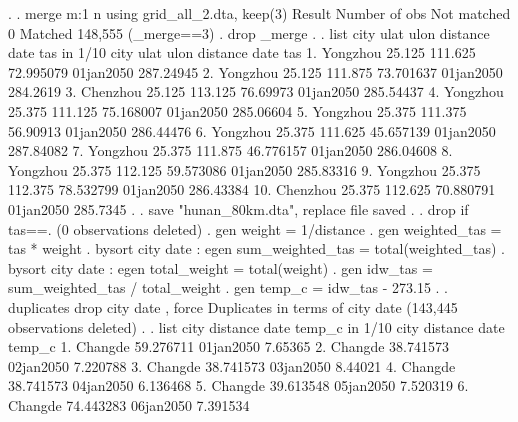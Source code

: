 {\smallskip}
. 
. merge m:1 n using grid_all_2.dta, keep(3)
{\smallskip}
    Result                      Number of obs
    Not matched                             0
    Matched                           148,555  (_merge==3)
{\smallskip}
. drop _merge
{\smallskip}
. 
. list city ulat ulon distance date tas in 1/10
{\smallskip}
     {\TLC}
     {\VBAR}     city     ulat      ulon    distance        date         tas {\VBAR}
     {\LFTT}
  1. {\VBAR} Yongzhou   25.125   111.625   72.995079   01jan2050   287.24945 {\VBAR}
  2. {\VBAR} Yongzhou   25.125   111.875   73.701637   01jan2050    284.2619 {\VBAR}
  3. {\VBAR} Chenzhou   25.125   113.125    76.69973   01jan2050   285.54437 {\VBAR}
  4. {\VBAR} Yongzhou   25.375   111.125   75.168007   01jan2050   285.06604 {\VBAR}
  5. {\VBAR} Yongzhou   25.375   111.375    56.90913   01jan2050   286.44476 {\VBAR}
     {\LFTT}
  6. {\VBAR} Yongzhou   25.375   111.625   45.657139   01jan2050   287.84082 {\VBAR}
  7. {\VBAR} Yongzhou   25.375   111.875   46.776157   01jan2050   286.04608 {\VBAR}
  8. {\VBAR} Yongzhou   25.375   112.125   59.573086   01jan2050   285.83316 {\VBAR}
  9. {\VBAR} Yongzhou   25.375   112.375   78.532799   01jan2050   286.43384 {\VBAR}
 10. {\VBAR} Chenzhou   25.375   112.625   70.880791   01jan2050    285.7345 {\VBAR}
     {\BLC}
{\smallskip}
. 
. save "hunan_80km.dta", replace
file{} saved
{\smallskip}
. 
. drop if tas==.
(0 observations deleted)
{\smallskip}
. gen weight  = 1/distance
{\smallskip}
. gen weighted_tas = tas * weight
{\smallskip}
. bysort city date : egen sum_weighted_tas = total(weighted_tas)
{\smallskip}
. bysort city date : egen total_weight = total(weight)
{\smallskip}
. gen idw_tas = sum_weighted_tas / total_weight
{\smallskip}
. gen temp_c = idw_tas - 273.15
{\smallskip}
. 
. duplicates drop city date , force
{\smallskip}
Duplicates in terms of city date
{\smallskip}
(143,445 observations deleted)
{\smallskip}
. 
. list city  distance date  temp_c in 1/10
{\smallskip}
     {\TLC}
     {\VBAR}    city    distance        date     temp_c {\VBAR}
     {\LFTT}
  1. {\VBAR} Changde   59.276711   01jan2050    7.65365 {\VBAR}
  2. {\VBAR} Changde   38.741573   02jan2050   7.220788 {\VBAR}
  3. {\VBAR} Changde   38.741573   03jan2050    8.44021 {\VBAR}
  4. {\VBAR} Changde   38.741573   04jan2050   6.136468 {\VBAR}
  5. {\VBAR} Changde   39.613548   05jan2050   7.520319 {\VBAR}
     {\LFTT}
  6. {\VBAR} Changde   74.443283   06jan2050   7.391534 {\VBAR}
